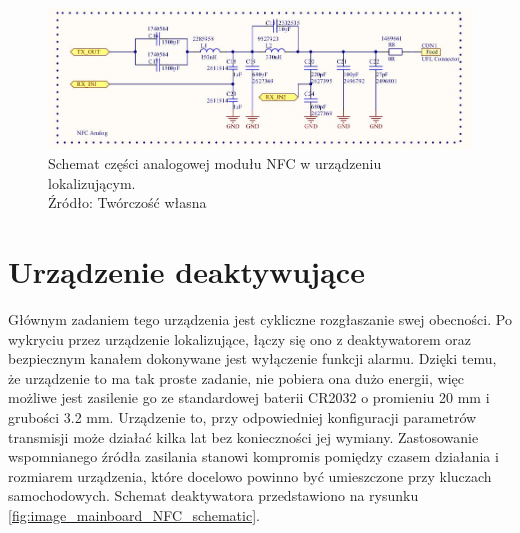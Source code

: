 \begin{figure}[H]
	\centering
	\includegraphics[width=15cm]{img/schematics/mainboard_NFC_analog.jpg}
	\caption{Schemat części analogowej modułu NFC w urządzeniu lokalizującym. \\ Źródło: Twórczość własna}
	\label{fig:image_mainboard_NFC_analog}
\end{figure}


\clearpage
\section{Urządzenie deaktywujące}

Głównym zadaniem tego urządzenia jest cykliczne rozgłaszanie swej obecności. Po wykryciu przez urządzenie lokalizujące, łączy się ono z deaktywatorem oraz bezpiecznym kanałem dokonywane jest wyłączenie funkcji alarmu. Dzięki temu, że urządzenie to ma tak proste zadanie, nie pobiera ona dużo    energii, więc możliwe jest zasilenie go ze standardowej baterii CR2032 o promieniu 20 mm i grubości 3.2 mm. Urządzenie to, przy odpowiedniej konfiguracji parametrów transmisji może działać kilka lat bez konieczności jej wymiany. Zastosowanie wspomnianego źródła zasilania stanowi kompromis pomiędzy czasem działania i rozmiarem urządzenia, które docelowo powinno być umieszczone przy kluczach samochodowych. Schemat deaktywatora przedstawiono na rysunku \ref{fig:image_mainboard_NFC_schematic}.

